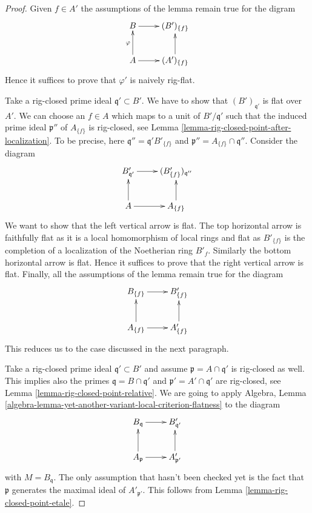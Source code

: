 \documentclass[10pt,a4paper]{amsart}
\theoremstyle{plain}
\theoremstyle{definition}
\theoremstyle{remark}
\numberwithin{equation}{subsection}
\begin{document}
\begin{proof}
Given $f \in A'$ the assumptions of the lemma remain true for the digram
$$
\xymatrix{
B \ar[r] & (B')_{\{f\}} \\
A \ar[r] \ar[u]^\varphi & (A')_{\{f\}} \ar[u]
}
$$
Hence it suffices to prove that $\varphi'$ is naively rig-flat.

\medskip\noindent
Take a rig-closed prime ideal $\mathfrak q' \subset B'$.
We have to show that $(B')_{\mathfrak q'}$ is flat over $A'$.
We can choose an $f \in A$ which maps to a unit of $B'/\mathfrak q'$
such that the induced prime ideal $\mathfrak p''$ of $A_{\{f\}}$ 
is rig-closed, see Lemma \ref{lemma-rig-closed-point-after-localization}.
To be precise, here $\mathfrak q'' = \mathfrak q' B'_{\{f\}}$ and
$\mathfrak p'' = A_{\{f\}} \cap \mathfrak q''$.
Consider the diagram
$$
\xymatrix{
B'_{\mathfrak q'} \ar[r] &
(B'_{\{f\}})_{\mathfrak q''} \\
A \ar[r] \ar[u] &
A_{\{f\}} \ar[u]
}
$$
We want to show that the left vertical arrow is flat.
The top horizontal arrow is faithfully flat as it is a local
homomorphism of local rings and flat as $B'_{\{f\}}$
is the completion of a localization of the Noetherian ring
$B'_f$. Similarly the bottom horizontal arrow is flat.
Hence it suffices to prove that the right vertical arrow is flat.
Finally, all the assumptions of the lemma remain true for the diagram
$$
\xymatrix{
B_{\{f\}} \ar[r] &
B'_{\{f\}} \\
A_{\{f\}} \ar[r] \ar[u] &
A'_{\{f\}} \ar[u]
}
$$
This reduces us to the case discussed in the next paragraph.

\medskip\noindent
Take a rig-closed prime ideal $\mathfrak q' \subset B'$
and assume $\mathfrak p = A \cap \mathfrak q'$ is rig-closed as well.
This implies also the primes $\mathfrak q = B \cap \mathfrak q'$
and $\mathfrak p' = A' \cap \mathfrak q'$ are rig-closed, see
Lemma \ref{lemma-rig-closed-point-relative}.
We are going to apply
Algebra, Lemma \ref{algebra-lemma-yet-another-variant-local-criterion-flatness}
to the diagram
$$
\xymatrix{
B_\mathfrak q \ar[r] &
B'_{\mathfrak q'} \\
A_\mathfrak p \ar[u] \ar[r] &
A'_{\mathfrak p'} \ar[u]
}
$$
with $M = B_\mathfrak q$. The only assumption that hasn't been checked yet
is the fact that $\mathfrak p$ generates the maximal ideal of
$A'_{\mathfrak p'}$. This follows from
Lemma \ref{lemma-rig-closed-point-etale}.
\end{proof}
\end{document}
